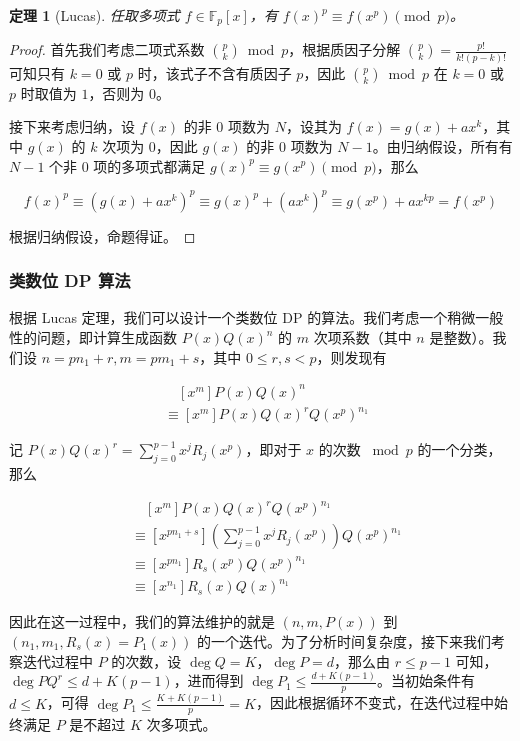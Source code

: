 \documentclass[12pt]{ctexart}
\theoremstyle{theorem}
\theoremstyle{theorem}
\newtheorem{theorem}{\bfseries\textsf {定理}}
\begin{document}
\begin{theorem}[Lucas]
任取多项式 $f\in \mathbb F_p[x]$，有 $f(x)^p \equiv f(x^p) \pmod p$。
\end{theorem}

\begin{proof}

首先我们考虑二项式系数 $\binom p k \bmod p$，根据质因子分解 $\binom pk = \frac{p!}{k!(p-k)!}$ 可知只有 $k=0$ 或 $p$ 时，该式子不含有质因子 $p$，因此 $\binom p k \bmod p$ 在 $k=0$ 或 $p$ 时取值为 $1$，否则为 $0$。

接下来考虑归纳，设 $f(x)$ 的非 $0$ 项数为 $N$，设其为 $f(x)=g(x)+ax^k$，其中 $g(x)$ 的 $k$ 次项为 $0$，因此 $g(x)$ 的非 $0$ 项数为 $N-1$。由归纳假设，所有有 $N-1$ 个非 $0$ 项的多项式都满足 $g(x)^p\equiv g(x^p)\pmod p$，那么

$$
f(x)^p \equiv (g(x)+ax^k)^p \equiv g(x)^p + (ax^k)^p \equiv g(x^p) + ax^{kp} = f(x^p)
$$

根据归纳假设，命题得证。

\end{proof}

\subsubsection{类数位 DP 算法}\label{dp}

根据 Lucas 定理，我们可以设计一个类数位 DP 的算法。我们考虑一个稍微一般性的问题，即计算生成函数 $P(x)Q(x)^n$ 的 $m$ 次项系数（其中 $n$ 是整数）。我们设 $n=pn_1+r, m = pm_1 + s$，其中 $0\le r,s <p$，则发现有

\begin{align*}
&\quad [x^m]P(x)Q(x)^n\\
&\equiv [x^m]P(x)Q(x)^rQ(x^p)^{n_1}
\end{align*}

记 $P(x)Q(x)^r=\sum_{j=0}^{p-1} x^jR_j(x^p)$，即对于 $x$ 的次数 $\bmod p$ 的一个分类，那么

\begin{align*}
&\quad [x^m]P(x)Q(x)^rQ(x^p)^{n_1}\\
&\equiv [x^{pn_1+s}]\left(\sum_{j=0}^{p-1} x^jR_j(x^p)\right)Q(x^p)^{n_1}\\
&\equiv [x^{pn_1}]R_s(x^p)Q(x^p)^{n_1}\\
&\equiv [x^{n_1}]R_s(x)Q(x)^{n_1}
\end{align*}

因此在这一过程中，我们的算法维护的就是 $(n,m,P(x))$ 到 $(n_1,m_1,R_s(x)=P_1(x))$ 的一个迭代。为了分析时间复杂度，接下来我们考察迭代过程中 $P$ 的次数，设 $\deg Q=K$，$\deg P = d$，那么由 $r\le p-1$ 可知，$\deg PQ^r \le d+K(p-1)$，进而得到 $\deg P_1 \le \frac{d + K(p-1)}p$。当初始条件有 $d\leq K$，可得 $\deg P_1 \leq \frac{K+K(p-1)}p = K$，因此根据循环不变式，在迭代过程中始终满足 $P$ 是不超过 $K$ 次多项式。
\end{document}
